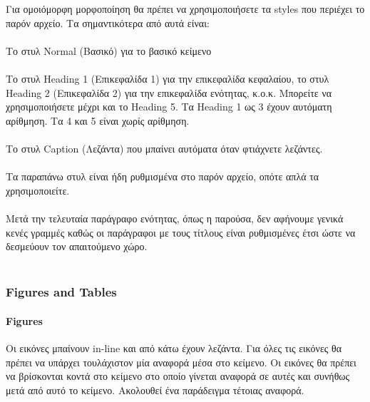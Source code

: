 \begin{flushleft}
    Για ομοιόμορφη μορφοποίηση θα πρέπει να χρησιμοποιήσετε τα styles που περιέχει το παρόν αρχείο. Τα σημαντικότερα από αυτά είναι: \\~\\

    Το στυλ Normal (Βασικό) για το βασικό κείμενο \\~\\
    
    Το στυλ Heading 1 (Επικεφαλίδα 1) για την επικεφαλίδα κεφαλαίου, το στυλ Heading 2 (Επικεφαλίδα 2) για την επικεφαλίδα ενότητας, κ.ο.κ. Μπορείτε να χρησιμοποιήσετε μέχρι και το Heading 5. Τα Heading 1 ως 3 έχουν αυτόματη αρίθμηση. Τα 4 και 5 είναι χωρίς αρίθμηση. \\~\\
    
    Το στυλ Caption (Λεζάντα) που μπαίνει αυτόματα όταν φτιάχνετε λεζάντες. \\~\\
    
    Τα παραπάνω στυλ είναι ήδη ρυθμισμένα στο παρόν αρχείο, οπότε απλά τα χρησιμοποιείτε.  \\~\\
    
    Μετά την τελευταία παράγραφο ενότητας, όπως η παρούσα, δεν αφήνουμε γενικά κενές γραμμές καθώς οι παράγραφοι με τους τίτλους είναι ρυθμισμένες έτσι ώστε να δεσμεύουν τον απαιτούμενο χώρο.  \\~\\
\end{flushleft}

\subsubsection{Figures and Tables}

\paragraph{Figures}

\begin{flushleft}
    Οι εικόνες μπαίνουν in-line και από κάτω έχουν λεζάντα. Για όλες τις εικόνες θα πρέπει να υπάρχει τουλάχιστον μία αναφορά μέσα στο κείμενο. Οι εικόνες θα πρέπει να βρίσκονται κοντά στο κείμενο στο οποίο γίνεται αναφορά σε αυτές και συνήθως μετά από αυτό το κείμενο. Ακολουθεί ένα παράδειγμα τέτοιας αναφορά. \\~\\
\end{flushleft}

